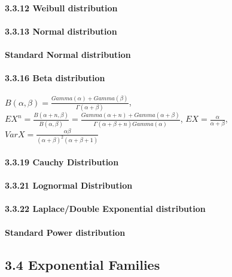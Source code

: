 \documentclass[6pt,twocolumn,Portrait]{article}
\let\oldparagraph\paragraph
\renewcommand{\paragraph}[1]{\oldparagraph{#1}\mbox{}}
\begin{document}
\hypertarget{Weib}{%
\paragraph{3.3.12 Weibull distribution}\label{Weib}}

\hypertarget{Norm}{%
\paragraph{3.3.13 Normal distribution}\label{Norm}}

\hypertarget{SNorm}{%
\paragraph{Standard Normal distribution}\label{SNorm}}

\hypertarget{Beta}{%
\paragraph{3.3.16 Beta distribution}\label{Beta}}

\(B(\alpha,\beta)=\frac{Gamma(\alpha)+Gamma(\beta)}{\Gamma(\alpha+\beta)}\),
\(EX^n=\frac{B(\alpha+n,\beta)}{B(\alpha,\beta)}=\frac{Gamma(\alpha+n)+Gamma(\alpha+\beta)}{\Gamma(\alpha+\beta+n)Gamma(\alpha)}\),
\(EX=\frac{\alpha} {\alpha+\beta}\),
\(VarX=\frac{\alpha\beta}{(\alpha+\beta)^2(\alpha+\beta+1)}\)

\hypertarget{Cauchy}{%
\paragraph{3.3.19 Cauchy Distribution}\label{Cauchy}}

\hypertarget{LNorm}{%
\paragraph{3.3.21 Lognormal Distribution}\label{LNorm}}

\hypertarget{Laplace}{%
\paragraph{3.3.22 Laplace/Double Exponential
distribution}\label{Laplace}}

\hypertarget{SPower}{%
\paragraph{Standard Power distribution}\label{SPower}}

\hypertarget{exponential-families}{%
\subsection{3.4 Exponential Families}\label{exponential-families}}
\end{document}
